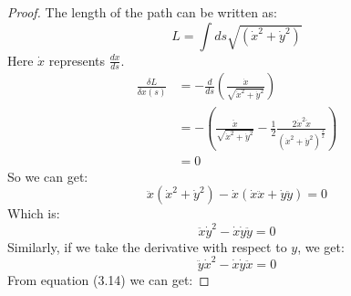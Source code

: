 \begin{proof}
    The length of the path can be written as:
    \begin{equation}
        L = \int ds \sqrt{\left(\dot{x}^2 + \dot{y}^2\right)}
    \end{equation}
    Here $\dot{x}$ represents $\frac{dx}{ds}$.
    \begin{align}
        \frac{\delta L}{\delta x\left(s\right)} &= -\frac{d}{ds} 
        \left(\frac{\dot{x}}{\sqrt{\dot{x}^2 + \dot{y}^2}}\right) \\
        &= -\left(\frac{\ddot{x}}{\sqrt{\dot{x}^2 + \dot{y}^2}} - \frac{1}{2} 
        \frac{2\dot{x}^2\ddot{x}}{\left(\dot{x}^2+\dot{y}^2\right)^{\frac{3}{2}}}\right) \\
        &= 0
    \end{align}
    So we can get:
    \begin{equation}
        \ddot{x} \left(\dot{x}^2 + \dot{y}^2\right) - \dot{x}\left(\dot{x}\ddot{x} + \dot{y}\ddot{y}\right) = 0
    \end{equation}
    Which is:
    \begin{equation}
        \ddot{x} \dot{y}^2 - \dot{x} \dot{y} \ddot{y} = 0
    \end{equation}
    Similarly, if we take the derivative with respect to $y$, we get:
    \begin{equation}
        \ddot{y} \dot{x}^2 - \dot{x} \dot{y} \ddot{x} = 0
    \end{equation}
    From equation (3.14) we can get:

\end{proof}
